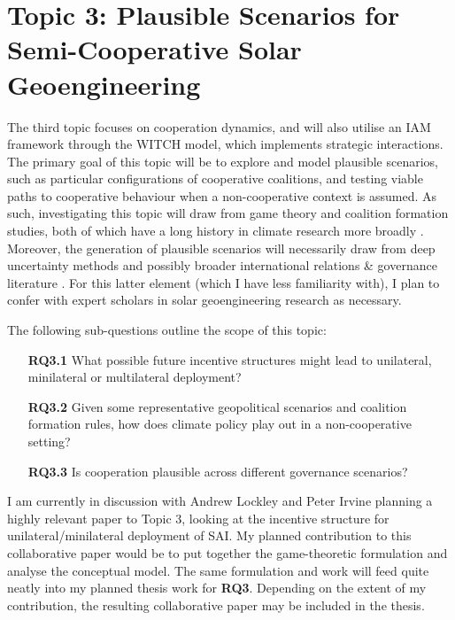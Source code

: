 \documentclass{article}
\begin{document}
\section*{Topic 3: Plausible Scenarios for Semi-Cooperative Solar Geoengineering}

The third topic focuses on cooperation dynamics, and will also utilise an IAM framework through the WITCH model, which implements strategic interactions. The primary goal of this topic will be to explore and model plausible scenarios, such as particular configurations of cooperative coalitions, and testing viable paths to cooperative behaviour when a non-cooperative context is assumed. As such, investigating this topic will draw from game theory and coalition formation studies, both of which have a long history in climate research more broadly \citep{carraro1993strategies}. Moreover, the generation of plausible scenarios will necessarily draw from deep uncertainty methods \citep{elsawah2020scenario,kwakkel2013exploratory} and possibly broader international relations \& governance literature \citep{reynolds2019solar}. For this latter element (which I have less familiarity with), I plan to confer with expert scholars in solar geoengineering research as necessary. \medskip

The following sub-questions outline the scope of this topic:

\begin{enumerate}
    \item[\textbf{RQ3.1}] What possible future incentive structures might lead to unilateral, minilateral or multilateral deployment?
    \item[\textbf{RQ3.2}] Given some representative geopolitical scenarios and coalition formation rules, how does climate policy play out in a non-cooperative setting?
    \item[\textbf{RQ3.3}] Is cooperation plausible across different governance scenarios?
\end{enumerate}

I am currently in discussion with Andrew Lockley and Peter Irvine planning a highly relevant paper to Topic 3, looking at the incentive structure for unilateral/minilateral deployment of SAI. My planned contribution to this collaborative paper would be to put together the game-theoretic formulation and analyse the conceptual model. The same formulation and work will feed quite neatly into my planned thesis work for \textbf{RQ3}. Depending on the extent of my contribution, the resulting collaborative paper may be included in the thesis. \medskip
\end{document}
